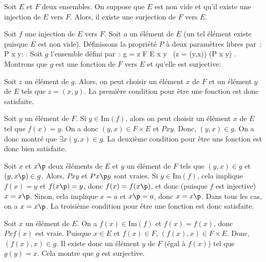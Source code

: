 \blank[medium]

\noindent{} 
Soit $E$ et $F$ deux ensembles. 
On suppose que $E$ est non vide et qu'il existe une injection de $E$ vers $F$. 
Alors, il existe une surjection de $F$ vers $E$. 

\blank[medium]

\noindent{}
Soit $f$ une injection de $E$ vers $F$. 
Soit $a$ un élément de $E$ (un tel élément existe puisque $E$ est non vide). 
Définissons la propriété $P$ à deux paramètres libres par : 
\startformula
    P x y: \left[(y \in \mathrm{Im}(f)) \wedge (f(x) = y) \right]
           \vee \left[(y \notin \mathrm{Im}(f)) \wedge (x=a) \right].
\stopformula
Soit $g$ l'ensemble défini par : 
\startformula
    g = \lbrace
        z \in F \times E \vert
        \exists x \exists y \, (z = (y,x)) \wedge (P x y)
    \rbrace .
\stopformula
Montrons que $g$ est une fonction de $F$ vers $E$ et qu'elle est surjective: 
\startitemize[nowhite]
    \item Soit $z$ un élément de $g$. 
        Alors, on peut choisir un élément $x$ de $F$ et un élément $y$ de $E$ tels que $z = (x,y)$.
        La première condition pour être une fonction est donc satisfaite. 
    \item Soit $y$ un élément de $F$. 
        Si $y \in \mathrm{Im}(f)$, alors on peut choisir un élément $x$ de $E$ tel que $f(x) = y$. 
        On a donc $(y,x) \in F \times E$ et $P x y$. 
        Donc, $(y,x) \in g$. 
        On a donc montré que $\exists x (y,x) \in g$. 
        La deuxième condition pour être uns fonction est donc bien satisfaite.
    \item Soit $x$ et $x\p$ deux éléments de $E$ et $y$ un élément de $F$ tels que $(y,x) \in g$ et $(y,x\p) \in g$.
        Alors, $P x y$ et $P x\p y$ sont vraies.
        Si $y \in \mathrm{Im}(f)$, cela implique $f(x) = y$ et $f(x\p) = y$, donc $f(x) = f(x\p)$, et donc (puisque $f$ est injective) $x = x\p$.
        Sinon, cela implique $x = a$ et $x\p = a$, donc $x = x\p$.
        Dans tous les cas, on a $x = x\p$. 
        La troisième condition pour être une fonction est donc satisfaite. 
    \item Soit $x$ un élément de $E$. On a $f(x) \in \mathrm{Im}(f)$ et $f(x) = f(x)$, donc $P x f(x)$ est vraie. 
        Puisque $x \in E$ et $f(x) \in F$, $(f(x),x) \in F \times E$. 
        Donc, $(f(x),x) \in g$. 
        Il existe donc un élément $y$ de $F$ (égal à $f(x)$) tel que $g(y) = x$. 
        Cela montre que $g$ est surjective.
\stopitemize

